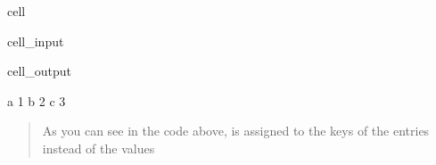 \documentclass[letterpaper,10pt,english]{jupyterBook}
\begin{document}
\begin{sphinxuseclass}{cell}\begin{sphinxVerbatimInput}

\begin{sphinxuseclass}{cell_input}
\begin{sphinxVerbatim}[commandchars=\\\{\}]
  
   
     \PYG{p}{[}\PYG{p}{]}
\end{sphinxVerbatim}

\end{sphinxuseclass}\end{sphinxVerbatimInput}
\begin{sphinxVerbatimOutput}

\begin{sphinxuseclass}{cell_output}
\begin{sphinxVerbatim}[commandchars=\\\{\}]
a 1
b 2
c 3
\end{sphinxVerbatim}

\end{sphinxuseclass}\end{sphinxVerbatimOutput}

\end{sphinxuseclass}\begin{quote}

\sphinxAtStartPar
As you can see in the code above,  is assigned to the keys of the entries instead of the values
\end{quote}







\renewcommand{\indexname}{Index}
\printindex
\end{document}
